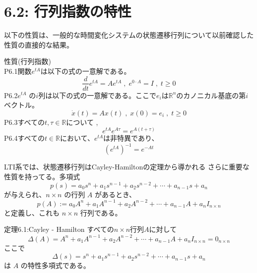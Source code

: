 \documentclass{jsarticle}
\begin{document}

\section*{6.2: 行列指数の特性 }

以下の性質は、一般的な時間変化システムの状態遷移行列について以前確認した性質の直接的な結果。

性質(行列指数)\\ 
P6.1\;\;関数$e^{tA}$は以下の式の一意解である。
\begin{equation}
  \frac{d}{dt}e^{tA} = Ae^{tA}\;,\;e^{0\cdot A} = I\;,\;t\geq 0
\end{equation}
P6.2\;\;$e^{tA}$ の$i$列は以下の式の一意解である。ここで$e_i$は$\mathbb{R}^n$のカノニカル基底の第$i$ベクトル。
\begin{equation}
  \dot{x}(t) = Ax(t)\;,\;x(0) = e_i\;,\;t\geq 0
\end{equation}
P6.3\;\;すべての$t,\tau \in \mathbb{R}$について , 
\begin{equation}
  e^{tA}e^{A\tau} = e^{A(t+\tau)}
\end{equation}
P6.4\;\;すべての$t\in \mathbb{R}$において、$e^{tA}$は非特異であり、
\begin{equation}
  {(e^{tA})}^{-1} = e^{-At}
\end{equation}

LTI系では、状態遷移行列はCayley-Hamiltonの定理から導かれる
さらに重要な性質を持ってる。多項式
\begin{equation}
  p(s) = a_0s^n + a_1s^{n-1}+a_2s^{n-2}+\cdots+a_{n-1}s+a_n
\end{equation}
が与えられ、$n\times n$ の行列 $A$ があるとき、
\begin{equation}
  p(A) := a_0A^n + a_1A^{n-1}+a_2A^{n-2}+\cdots+a_{n-1}A+a_nI_{n\times n}
\end{equation}
と定義し、これも $n\times n$ 行列である。

\begin{itembox}[l]{定理6.1:Cayley - Hamilton}
すべての$n\times n$行列$A$に対して 
\begin{equation}
  \Delta (A) = A^n + a_1A^{n-1}+a_2A^{n-2}+\cdots+a_{n-1}A+a_nI_{n\times n} = 0_{n\times n}
\end{equation}
ここで 
\begin{equation}
  \Delta (s) = s^n + a_1s^{n-1}+a_2s^{n-2}+\cdots+a_{n-1}s+a_n
\end{equation}
は $A$ の特性多項式である。
\end{itembox}
\end{document}
